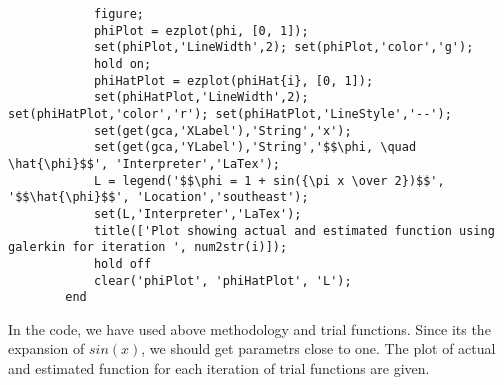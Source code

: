 \documentclass[11pt,paper=a4,answers]{exam}
\begin{document}
\begin{questions}
\begin{enumerate}[]
\begin{lstlisting}
            figure;
            phiPlot = ezplot(phi, [0, 1]);
            set(phiPlot,'LineWidth',2); set(phiPlot,'color','g');
            hold on;
            phiHatPlot = ezplot(phiHat{i}, [0, 1]);
            set(phiHatPlot,'LineWidth',2); set(phiHatPlot,'color','r'); set(phiHatPlot,'LineStyle','--');
            set(get(gca,'XLabel'),'String','x');
            set(get(gca,'YLabel'),'String','$$\phi, \quad \hat{\phi}$$', 'Interpreter','LaTex');
            L = legend('$$\phi = 1 + sin({\pi x \over 2})$$', '$$\hat{\phi}$$', 'Location','southeast');
            set(L,'Interpreter','LaTex');
            title(['Plot showing actual and estimated function using galerkin for iteration ', num2str(i)]);
            hold off
            clear('phiPlot', 'phiHatPlot', 'L');
        end
    \end{lstlisting}
    In the code, we have used above methodology and trial functions. Since its the expansion of $sin(x)$, we should get parametrs close to one. The plot of actual and estimated function for each iteration of trial functions are given.
\end{enumerate}
\end{questions}
\end{document}
